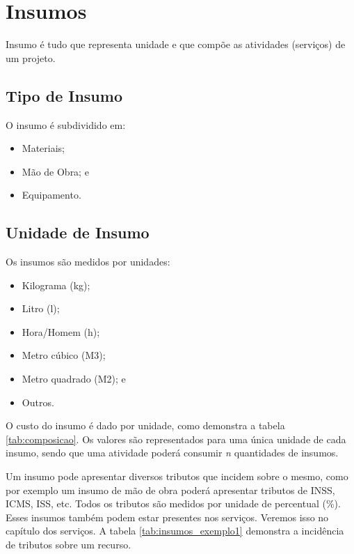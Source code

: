 \chapter{Insumos}

Insumo é tudo que representa unidade e que compõe as atividades (serviços) de um projeto.

\section{Tipo de Insumo}

O insumo é subdividido em: 

\begin{itemize}
	\item Materiais;
	\item Mão de Obra; e
	\item Equipamento.
\end{itemize}

\section{Unidade de Insumo}

Os insumos são medidos por unidades:

\begin{itemize}
	\item Kilograma (kg);
	\item Litro (l);
	\item Hora/Homem (h);
	\item Metro cúbico (M3);
	\item Metro quadrado (M2); e
	\item Outros.
\end{itemize}

O custo do insumo é dado por unidade, como demonstra a tabela \ref{tab:composicao}. Os valores são representados para uma única unidade de cada insumo, sendo que uma atividade poderá consumir \emph{n} quantidades de insumos.

Um insumo pode apresentar diversos tributos que incidem sobre o mesmo, como por exemplo um insumo de mão de obra poderá apresentar tributos de INSS, ICMS, ISS, etc. Todos os tributos são medidos por unidade de percentual (\%). Esses insumos também podem estar presentes nos serviços. Veremos isso no capítulo dos serviços. A tabela \ref{tab:insumos_exemplo1} demonstra a incidência de tributos sobre um recurso.

